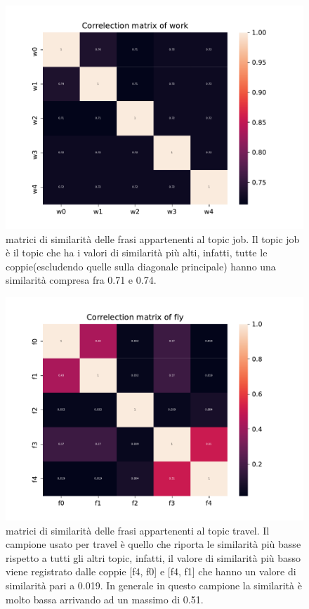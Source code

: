 \begin{figure}[h!t]
    \centering
    \includegraphics{Figure/simMatr/work.pdf}
    \caption{matrici di similarità delle frasi appartenenti al topic job. Il topic job è il topic che ha i valori di similarità più alti, infatti, tutte le coppie(escludendo quelle sulla diagonale principale) hanno una similarità compresa fra 0.71 e 0.74.}
    \label{fig:mtrsim_j}
\end{figure}
\FloatBarrier

\begin{figure}[h!t]
    \centering
    \includegraphics[width=15cm]{Figure/simMatr/fly.pdf}
    \caption{matrici di similarità delle frasi appartenenti al topic travel. Il campione usato per travel è quello che riporta le similarità più basse rispetto a tutti gli altri topic, infatti, il valore di similarità più basso viene registrato dalle coppie [f4, f0] e [f4, f1] che hanno un valore di similarità pari a 0.019. In generale in questo campione la similarità è molto bassa arrivando ad un massimo di 0.51.}
    \label{fig:mtrsim_t}
\end{figure}
\FloatBarrier

